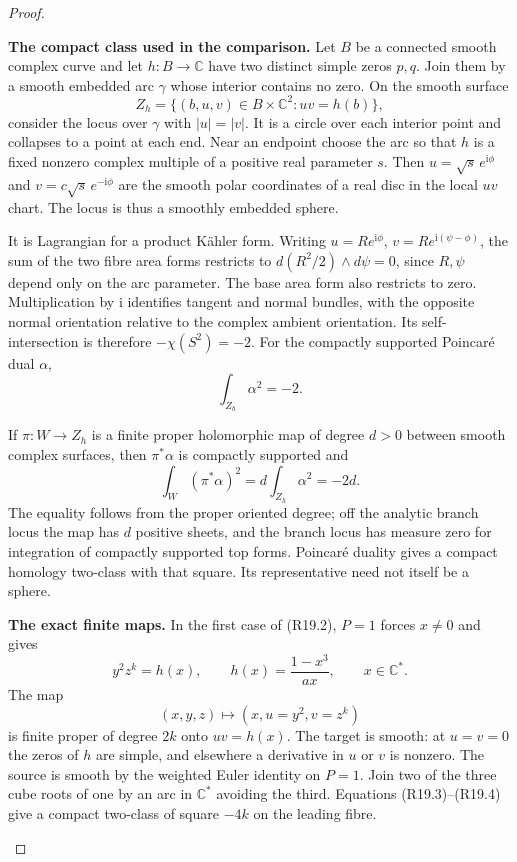 \begin{proof}
\begin{enumerate}[label={$\langle1\rangle$\arabic*.},leftmargin=*]
\par\medskip\noindent\textbf{The compact class used in the comparison.}
Let $B$ be a connected smooth complex curve and let
$h:B\to\mathbb C$ have two distinct simple zeros $p,q$.
Join them by a smooth embedded arc $\gamma$ whose
interior contains no zero. On the smooth surface
\[
             Z_h=\{(b,u,v)\in B\times\mathbb C^2:
                                      uv=h(b)\},
\]
consider the locus over $\gamma$ with $|u|=|v|$.
It is a circle over each interior point and collapses
to a point at each end. Near an endpoint choose the
arc so that $h$ is a fixed nonzero complex multiple
of a positive real parameter $s$. Then
$u=\sqrt{s}\,e^{\mathrm i\phi}$ and
$v=c\sqrt{s}\,e^{-\mathrm i\phi}$ are the smooth
polar coordinates of a real disc in the local $uv$
chart. The locus is thus a smoothly embedded sphere.

It is Lagrangian for a product K\"ahler form.
Writing $u=R e^{\mathrm i\phi}$,
$v=R e^{\mathrm i(\psi-\phi)}$, the sum of the two
fibre area forms restricts to
$d(R^2/2)\wedge d\psi=0$, since $R,\psi$ depend
only on the arc parameter. The base area form also
restricts to zero. Multiplication by $\mathrm i$
identifies tangent and normal bundles, with the
opposite normal orientation relative to the complex
ambient orientation. Its self-intersection is
therefore $-\chi(S^2)=-2$.
For the compactly supported Poincar\'e dual $\alpha$,
\[
                         \int_{Z_h}\alpha^2=-2.             \tag{R19.3}
\]

If $\pi:W\to Z_h$ is a finite proper holomorphic map
of degree $d>0$ between smooth complex surfaces, then
$\pi^*\alpha$ is compactly supported and
\[
              \int_W(\pi^*\alpha)^2
                       =d\int_{Z_h}\alpha^2=-2d.            \tag{R19.4}
\]
The equality follows from the proper oriented degree;
off the analytic branch locus the map has $d$ positive
sheets, and the branch locus has measure zero for
integration of compactly supported top forms.
Poincar\'e duality gives a compact homology two-class
with that square. Its representative need not itself
be a sphere.

\par\medskip\noindent\textbf{The exact finite maps.}
In the first case of (R19.2), $P=1$ forces $x\ne0$
and gives
\[
           y^2z^k=h(x),\qquad
           h(x)=\frac{1-x^3}{ax},\qquad x\in\mathbb C^*.
\]
The map
\[
 (x,y,z)\longmapsto(x,u=y^2,v=z^k)
\]
is finite proper of degree $2k$ onto $uv=h(x)$.
The target is smooth: at $u=v=0$ the zeros of $h$
are simple, and elsewhere a derivative in $u$ or
$v$ is nonzero. The source is smooth by the weighted
Euler identity on $P=1$. Join two of the three cube
roots of one by an arc in $\mathbb C^*$ avoiding the
third. Equations (R19.3)--(R19.4) give a compact
two-class of square $-4k$ on the leading fibre.


\end{enumerate}
\end{proof}
